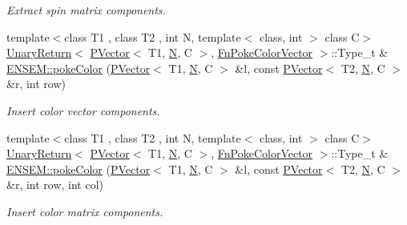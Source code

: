 \begin{DoxyCompactItemize}
\begin{DoxyCompactList}\small\item\em Extract spin matrix components. \end{DoxyCompactList}\item 
{\footnotesize template$<$class T1 , class T2 , int N, template$<$ class, int $>$ class C$>$ }\\\mbox{\hyperlink{structENSEM_1_1UnaryReturn}{Unary\+Return}}$<$ \mbox{\hyperlink{classENSEM_1_1PVector}{P\+Vector}}$<$ T1, \mbox{\hyperlink{operator__name__util_8cc_a7722c8ecbb62d99aee7ce68b1752f337}{N}}, C $>$, \mbox{\hyperlink{structENSEM_1_1FnPokeColorVector}{Fn\+Poke\+Color\+Vector}} $>$\+::Type\+\_\+t \& \mbox{\hyperlink{group__primvector_ga8643fc63839f4ef1bdbb168de2385c5e}{E\+N\+S\+E\+M\+::poke\+Color}} (\mbox{\hyperlink{classENSEM_1_1PVector}{P\+Vector}}$<$ T1, \mbox{\hyperlink{operator__name__util_8cc_a7722c8ecbb62d99aee7ce68b1752f337}{N}}, C $>$ \&l, const \mbox{\hyperlink{classENSEM_1_1PVector}{P\+Vector}}$<$ T2, \mbox{\hyperlink{operator__name__util_8cc_a7722c8ecbb62d99aee7ce68b1752f337}{N}}, C $>$ \&r, int row)
\begin{DoxyCompactList}\small\item\em Insert color vector components. \end{DoxyCompactList}\item 
{\footnotesize template$<$class T1 , class T2 , int N, template$<$ class, int $>$ class C$>$ }\\\mbox{\hyperlink{structENSEM_1_1UnaryReturn}{Unary\+Return}}$<$ \mbox{\hyperlink{classENSEM_1_1PVector}{P\+Vector}}$<$ T1, \mbox{\hyperlink{operator__name__util_8cc_a7722c8ecbb62d99aee7ce68b1752f337}{N}}, C $>$, \mbox{\hyperlink{structENSEM_1_1FnPokeColorVector}{Fn\+Poke\+Color\+Vector}} $>$\+::Type\+\_\+t \& \mbox{\hyperlink{group__primvector_ga756245fd2f8bde2eab2ef42e08578af6}{E\+N\+S\+E\+M\+::poke\+Color}} (\mbox{\hyperlink{classENSEM_1_1PVector}{P\+Vector}}$<$ T1, \mbox{\hyperlink{operator__name__util_8cc_a7722c8ecbb62d99aee7ce68b1752f337}{N}}, C $>$ \&l, const \mbox{\hyperlink{classENSEM_1_1PVector}{P\+Vector}}$<$ T2, \mbox{\hyperlink{operator__name__util_8cc_a7722c8ecbb62d99aee7ce68b1752f337}{N}}, C $>$ \&r, int row, int col)
\begin{DoxyCompactList}\small\item\em Insert color matrix components. \end{DoxyCompactList}\item 

\end{DoxyCompactItemize}
